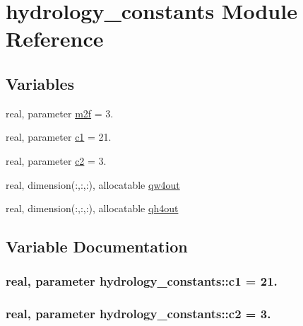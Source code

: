 \hypertarget{namespacehydrology__constants}{}\section{hydrology\+\_\+constants Module Reference}
\label{namespacehydrology__constants}
\subsection*{Variables}
\begin{DoxyCompactItemize}
\item 
real, parameter \hyperlink{namespacehydrology__constants_ab490db8c3db1149de2c3a999ca405462}{m2f} = 3.
\item 
real, parameter \hyperlink{namespacehydrology__constants_aab37efe722e2cb3021d692662a4f71be}{c1} = 21.
\item 
real, parameter \hyperlink{namespacehydrology__constants_af41d19dbcc0f506fe98fcd9d081ee8d9}{c2} = 3.
\item 
real, dimension(\+:,\+:,\+:), allocatable \hyperlink{namespacehydrology__constants_a4a968142e8621f39c2e739983340bb25}{qw4out}
\item 
real, dimension(\+:,\+:,\+:), allocatable \hyperlink{namespacehydrology__constants_aab3e1ed337a2f4bb8ac1ae647b9ebd65}{qh4out}
\end{DoxyCompactItemize}


\subsection{Variable Documentation}
\hypertarget{namespacehydrology__constants_aab37efe722e2cb3021d692662a4f71be}{}
\subsubsection[{c1}]{\setlength{\rightskip}{0pt plus 5cm}real, parameter hydrology\+\_\+constants\+::c1 = 21.}\label{namespacehydrology__constants_aab37efe722e2cb3021d692662a4f71be}
\hypertarget{namespacehydrology__constants_af41d19dbcc0f506fe98fcd9d081ee8d9}{}
\subsubsection[{c2}]{\setlength{\rightskip}{0pt plus 5cm}real, parameter hydrology\+\_\+constants\+::c2 = 3.}\label{namespacehydrology__constants_af41d19dbcc0f506fe98fcd9d081ee8d9}
\hypertarget{namespacehydrology__constants_ab490db8c3db1149de2c3a999ca405462}{}
